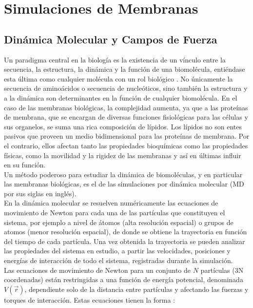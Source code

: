 \chapter{Simulaciones de Membranas}
\section{Din\'{a}mica Molecular y Campos de Fuerza}\label{ss:md} 
Un paradigma central en la biolog\'{i}a es la existencia de un v\'{i}nculo entre la secuencia, la estructura, la din\'{a}mica y la funci\'{o}n de una biomol\'{e}cula, enti\'{e}ndase esta \'{u}ltima como cualquier mol\'{e}cula con un rol biol\'{o}gico \cite{Cui2006}. No \'{u}nicamente la secuencia de amino\'{a}cidos o secuencia de nucle\'{o}ticos, sino tambi\'{e}n la estructura y a la din\'{a}mica son determinantes en la funci\'{o}n de cualquier biomol\'{e}cula. En el caso de las membranas biol\'{o}gicas, la complejidad aumenta, ya que a las prote\'{i}nas de membrana, que se encargan de diversas funciones fisiol\'{o}gicas para las c\'{e}lulas y sus organelos, se suma una rica composici\'{o}n de l\'{i}pidos. Los l\'{i}pidos no son entes pasivos que proveen un medio bidimensional para las prote\'{i}nas de membrana. Por el contrario, ellos afectan tanto las propiedades bioqu\'{i}micas como las propiedades f\'{i}sicas, como la movilidad y la rigidez de las membranas y as\'{i} en \'{u}ltimas influir en su funci\'{o}n.\\

Un m\'{e}todo poderoso para estudiar la din\'{a}mica de biomol\'{e}culas, y en particular las membranas biol\'{o}gicas, es el de las simulaciones por din\'{a}mica molecular (MD por sus siglas en ingl\'{e}s).\\

En la din\'{a}mica molecular se resuelven num\'{e}ricamente las ecuaciones de movimiento de Newton para cada una de las part\'{i}culas que constituyen el sistema, por ejemplo a nivel de \'{a}tomos (alta resoluci\'{o}n espacial) o grupos de atomos (menor resoluci\'{o}n espacial), de donde se obtiene la trayectoria en funci\'{o}n del tiempo de cada part\'{i}cula. Una vez obtenida la trayectoria se pueden analizar las propiedades del sistema en estudio, a partir las velocidades, posiciones y energ\'{i}as de interacci\'{o}n de todo el sistema, registradas durante la simulaci\'{o}n.\\

Las ecuaciones de movimiento de Newton para un conjunto de $N$ part\'{i}culas (3N coordenadas) est\'{a}n restringidas a una funci\'{o}n de energ\'{i}a potencial, denominada $V(\vec{r})$, dependiente solo de la distancia entre part\'{i}culas y afectando las fuerzas y torques de interacci\'{o}n. Estas ecuaciones tienen la forma \cite{Goldstein2001}:

